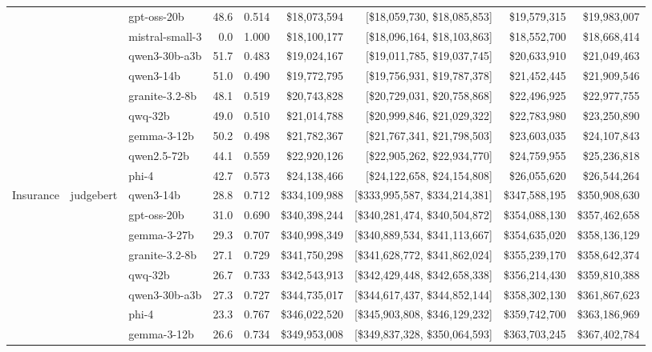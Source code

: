 \begin{table}[t]
\begin{tabular}{lllrrrrrr}
   &  & gpt-oss-20b & 48.6 & 0.514 & \$18,073,594 & [\$18,059,730, \$18,085,853] & \$19,579,315 & \$19,983,007 \\
   &  & mistral-small-3 & 0.0 & 1.000 & \$18,100,177 & [\$18,096,164, \$18,103,863] & \$18,552,700 & \$18,668,414 \\
   &  & qwen3-30b-a3b & 51.7 & 0.483 & \$19,024,167 & [\$19,011,785, \$19,037,745] & \$20,633,910 & \$21,049,463 \\
   &  & qwen3-14b & 51.0 & 0.490 & \$19,772,795 & [\$19,756,931, \$19,787,378] & \$21,452,445 & \$21,909,546 \\
   &  & granite-3.2-8b & 48.1 & 0.519 & \$20,743,828 & [\$20,729,031, \$20,758,868] & \$22,496,925 & \$22,977,755 \\
   &  & qwq-32b & 49.0 & 0.510 & \$21,014,788 & [\$20,999,846, \$21,029,322] & \$22,783,980 & \$23,250,890 \\
   &  & gemma-3-12b & 50.2 & 0.498 & \$21,782,367 & [\$21,767,341, \$21,798,503] & \$23,603,035 & \$24,107,843 \\
   &  & qwen2.5-72b & 44.1 & 0.559 & \$22,920,126 & [\$22,905,262, \$22,934,770] & \$24,759,955 & \$25,236,818 \\
   &  & phi-4 & 42.7 & 0.573 & \$24,138,466 & [\$24,122,658, \$24,154,808] & \$26,055,620 & \$26,544,264 \\
\midrule
  Insurance & judgebert & qwen3-14b & 28.8 & 0.712 & \$334,109,988 & [\$333,995,587, \$334,214,381] & \$347,588,195 & \$350,908,630 \\
   &  & gpt-oss-20b & 31.0 & 0.690 & \$340,398,244 & [\$340,281,474, \$340,504,872] & \$354,088,130 & \$357,462,658 \\
   &  & gemma-3-27b & 29.3 & 0.707 & \$340,998,349 & [\$340,889,534, \$341,113,667] & \$354,635,020 & \$358,136,129 \\
   &  & granite-3.2-8b & 27.1 & 0.729 & \$341,750,298 & [\$341,628,772, \$341,862,024] & \$355,239,170 & \$358,642,374 \\
   &  & qwq-32b & 26.7 & 0.733 & \$342,543,913 & [\$342,429,448, \$342,658,338] & \$356,214,430 & \$359,810,388 \\
   &  & qwen3-30b-a3b & 27.3 & 0.727 & \$344,735,017 & [\$344,617,437, \$344,852,144] & \$358,302,130 & \$361,867,623 \\
   &  & phi-4 & 23.3 & 0.767 & \$346,022,520 & [\$345,903,808, \$346,129,232] & \$359,742,700 & \$363,186,969 \\
   &  & gemma-3-12b & 26.6 & 0.734 & \$349,953,008 & [\$349,837,328, \$350,064,593] & \$363,703,245 & \$367,402,784 \\

\end{tabular}
\end{table}
